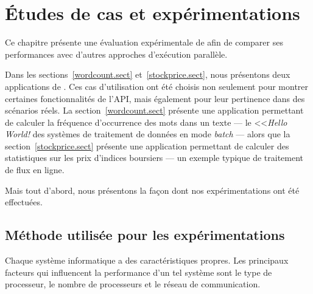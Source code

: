 
\chapter{\'Etudes de cas et exp\'erimentations}
\label{experiences.chap}


Ce chapitre pr\'esente une \'evaluation exp\'erimentale de  afin de comparer ses performances avec d'autres approches d'ex\'ecution parall\`ele.   

Dans les sections~\ref{wordcount.sect} et~\ref{stockprice.sect}, nous pr\'esentons deux applications de . Ces cas d'utilisation ont \'et\'e choisis non seulement pour montrer certaines fonctionnalit\'es de l'API, mais \'egalement pour leur pertinence dans des sc\'enarios r\'eels. La section~\ref{wordcount.sect} pr\'esente une application permettant de calculer la fr\'equence d'occurrence des mots dans un texte --- le <<\emph{Hello World!} des syst\`emes de traitement de donn\'ees en mode \emph{batch} --- alors que la section~\ref{stockprice.sect} pr\'esente une application permettant de calculer des statistiques sur les prix d'indices boursiers --- un exemple typique de traitement de flux en ligne.

Mais tout d'abord, nous pr\'esentons la fa\c{c}on dont nos
exp\'erimentations ont \'et\'e effectu\'ees.

\section{M\'ethode utilis\'ee pour les exp\'erimentations}
\label{usedMethodsForBenchmarks.chap}

Chaque syst\`eme informatique a des caract\'eristiques propres. Les principaux facteurs qui influencent la performance d'un tel syst\`eme sont le type de processeur, le nombre de processeurs et le r\'eseau de communication. 






